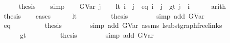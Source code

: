 \begin{isabellebody}
\ \ \isamarkupfalse%
\ \isamarkupfalse%
\ {\isacharquery}{\kern0pt}thesis\isanewline
\ \ \isamarkupfalse%
\ simp\isanewline
{}\isamarkupfalse%
\isanewline
\ \ \isamarkupfalse%
\ {\isacharparenleft}{\kern0pt}GVar\ j{\isacharparenright}{\kern0pt}\isanewline
\ \ \isamarkupfalse%
\ {\isacharparenleft}{\kern0pt}lt{\isacharparenright}{\kern0pt}\ {\isachardoublequoteopen}i\ {\isacharless}{\kern0pt}\ j{\isachardoublequoteclose}\ {\isacharbar}{\kern0pt}\ {\isacharparenleft}{\kern0pt}eq{\isacharparenright}{\kern0pt}\ {\isachardoublequoteopen}i\ {\isacharequal}{\kern0pt}\ j{\isachardoublequoteclose}\ {\isacharbar}{\kern0pt}\ {\isacharparenleft}{\kern0pt}gt{\isacharparenright}{\kern0pt}\ {\isachardoublequoteopen}j\ {\isacharless}{\kern0pt}\ i{\isachardoublequoteclose}\isanewline
\ \ \ \ \isamarkupfalse%
\ arith\isanewline
\ \ \isamarkupfalse%
\ \isamarkupfalse%
\ {\isacharquery}{\kern0pt}thesis\isanewline
\ \ \isamarkupfalse%
\ cases\isanewline
\ \ \ \ \isamarkupfalse%
\ lt\isanewline
\ \ \ \ \ \ \isamarkupfalse%
\ \isamarkupfalse%
\ {\isacharquery}{\kern0pt}thesis\isanewline
\ \ \ \ \ \ \isamarkupfalse%
\ {\isacharparenleft}{\kern0pt}simp\ add{\isacharcolon}{\kern0pt}\ GVar{\isacharparenright}{\kern0pt}\isanewline
\ \ \ \ \isamarkupfalse%
\isanewline
\ \ \ \ \isamarkupfalse%
\ eq\isanewline
\ \ \ \ \ \ \isamarkupfalse%
\ \isamarkupfalse%
\ {\isacharquery}{\kern0pt}thesis\isanewline
\ \ \ \ \ \ \isamarkupfalse%
\ {\isacharparenleft}{\kern0pt}simp\ add{\isacharcolon}{\kern0pt}\ GVar\ assms{\isacharparenleft}{\kern0pt}{}{\isacharcomma}{\kern0pt}{}{\isacharparenright}{\kern0pt}\ lsubst{\isacharunderscore}{\kern0pt}graph{\isacharunderscore}{\kern0pt}freelinks{\isacharparenright}{\kern0pt}\isanewline
\ \ \ \ \isamarkupfalse%
\isanewline
\ \ \ \ \isamarkupfalse%
\ gt\isanewline
\ \ \ \ \ \ \isamarkupfalse%
\ \isamarkupfalse%
\ {\isacharquery}{\kern0pt}thesis\isanewline
\ \ \ \ \ \ \isamarkupfalse%
\ {\isacharparenleft}{\kern0pt}simp\ add{\isacharcolon}{\kern0pt}\ GVar{\isacharparenright}{\kern0pt}\isanewline
\ \ \ \isamarkupfalse%
\isanewline
{}\isamarkupfalse%

\end{isabellebody}
